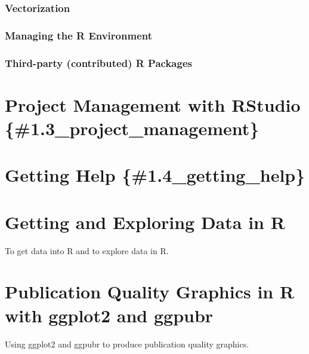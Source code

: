 \documentclass[
]{book}
\begin{document}
\hypertarget{vectorization}{%
\subsection{Vectorization}\label{vectorization}}

\hypertarget{managing-the-r-environment}{%
\subsection{Managing the R Environment}\label{managing-the-r-environment}}

\hypertarget{third-party-contributed-r-packages}{%
\subsection{Third-party (contributed) R Packages}\label{third-party-contributed-r-packages}}

\hypertarget{project-management-with-rstudio-1.3_project_management}{%
\chapter{Project Management with RStudio \{\#1.3\_project\_management\}}\label{project-management-with-rstudio-1.3_project_management}}

\hypertarget{getting-help-1.4_getting_help}{%
\chapter{Getting Help \{\#1.4\_getting\_help\}}\label{getting-help-1.4_getting_help}}

\hypertarget{getting-and-exploring-data-in-r}{%
\chapter{Getting and Exploring Data in R}\label{getting-and-exploring-data-in-r}}

To get data into R and to explore data in R.

\hypertarget{publication-quality-graphics-in-r-with-ggplot2-and-ggpubr}{%
\chapter{Publication Quality Graphics in R with ggplot2 and ggpubr}\label{publication-quality-graphics-in-r-with-ggplot2-and-ggpubr}}

Using ggplot2 and ggpubr to produce publication quality graphics.
\end{document}
